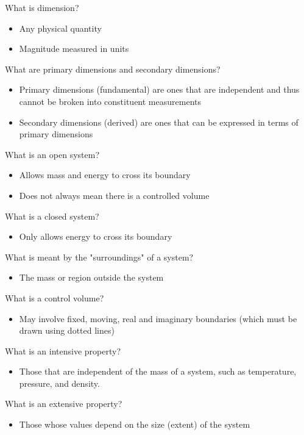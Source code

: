 \documentclass[class=report, crop=false, 12pt,a4paper]{standalone}
\begin{document}
What is dimension?
\begin{itemize}
  \item Any physical quantity
  \item Magnitude measured in units
\end{itemize}

What are primary dimensions and secondary dimensions?
\begin{itemize}
  \item Primary dimensions (fundamental) are ones that are independent and thus cannot be broken into constituent measurements
  \item Secondary dimensions (derived) are ones that can be expressed in terms of primary dimensions
\end{itemize}

What is an open system?
\begin{itemize}
  \item Allows mass and energy to cross its boundary
  \item Does not always mean there is a controlled volume
\end{itemize}

What is a closed system?
\begin{itemize}
  \item Only allows energy to cross its boundary
\end{itemize}

What is meant by the "surroundings" of a system?
\begin{itemize}
  \item The mass or region outside the system
\end{itemize}

What is a control volume?
\begin{itemize}
  \item May involve fixed, moving, real and imaginary boundaries (which must be drawn using dotted lines)
\end{itemize}

What is an intensive property?
\begin{itemize}
  \item Those that are independent of the mass of a system, such as temperature, pressure, and density.
\end{itemize}

What is an extensive property?
\begin{itemize}
  \item Those whose values depend on the size (extent) of the system
\end{itemize}
\end{document}

